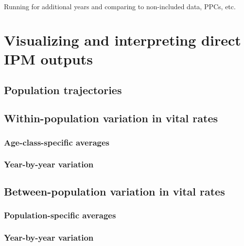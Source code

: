 \documentclass[
]{book}
\begin{document}
Running for additional years and comparing to non-included data, PPCs, etc.

\hypertarget{ResultsViz}{%
\chapter{Visualizing and interpreting direct IPM outputs}\label{ResultsViz}}

\hypertarget{population-trajectories}{%
\section{Population trajectories}\label{population-trajectories}}

\hypertarget{within-population-variation-in-vital-rates}{%
\section{Within-population variation in vital rates}\label{within-population-variation-in-vital-rates}}

\hypertarget{age-class-specific-averages}{%
\subsection{Age-class-specific averages}\label{age-class-specific-averages}}

\hypertarget{year-by-year-variation}{%
\subsection{Year-by-year variation}\label{year-by-year-variation}}

\hypertarget{between-population-variation-in-vital-rates}{%
\section{Between-population variation in vital rates}\label{between-population-variation-in-vital-rates}}

\hypertarget{population-specific-averages}{%
\subsection{Population-specific averages}\label{population-specific-averages}}

\hypertarget{year-by-year-variation-1}{%
\subsection{Year-by-year variation}\label{year-by-year-variation-1}}
\end{document}
